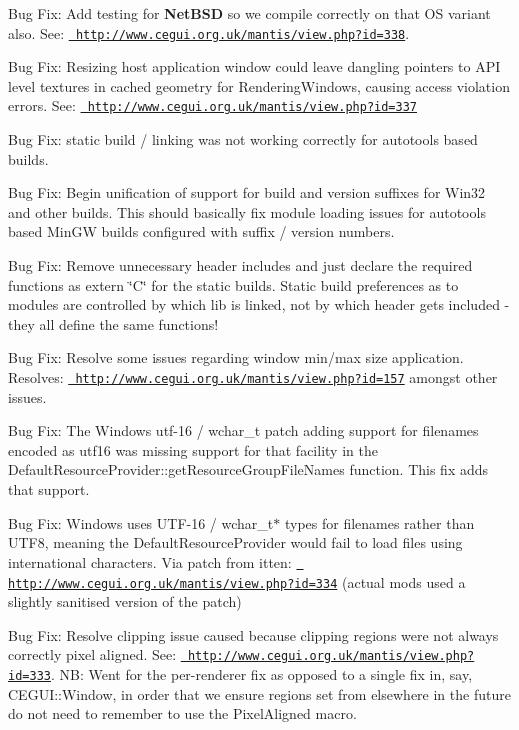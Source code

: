 \begin{DoxyItemize}
\item Bug Fix\+: Add testing for {\bfseries{Net\+B\+SD}} so we compile correctly on that OS variant also. See\+: \href{http://www.cegui.org.uk/mantis/view.php?id=338}{\texttt{ http\+://www.\+cegui.\+org.\+uk/mantis/view.\+php?id=338}}.
\item Bug Fix\+: Resizing host application window could leave dangling pointers to A\+PI level textures in cached geometry for Rendering\+Windows, causing access violation errors. See\+: \href{http://www.cegui.org.uk/mantis/view.php?id=337}{\texttt{ http\+://www.\+cegui.\+org.\+uk/mantis/view.\+php?id=337}}
\item Bug Fix\+: static build / linking was not working correctly for autotools based builds.
\item Bug Fix\+: Begin unification of support for build and version suffixes for Win32 and other builds. This should basically fix module loading issues for autotools based Min\+GW builds configured with suffix / version numbers.
\item Bug Fix\+: Remove unnecessary header includes and just declare the required functions as extern \char`\"{}\+C\char`\"{} for the static builds. Static build preferences as to modules are controlled by which lib is linked, not by which header gets included -\/ they all define the same functions!
\item Bug Fix\+: Resolve some issues regarding window min/max size application. Resolves\+: \href{http://www.cegui.org.uk/mantis/view.php?id=157}{\texttt{ http\+://www.\+cegui.\+org.\+uk/mantis/view.\+php?id=157}} amongst other issues.
\item Bug Fix\+: The Windows utf-\/16 / wchar\+\_\+t patch adding support for filenames encoded as utf16 was missing support for that facility in the Default\+Resource\+Provider\+::get\+Resource\+Group\+File\+Names function. This fix adds that support.
\item Bug Fix\+: Windows uses U\+T\+F-\/16 / wchar\+\_\+t$\ast$ types for filenames rather than U\+T\+F8, meaning the Default\+Resource\+Provider would fail to load files using international characters. Via patch from \textquotesingle{}itten\textquotesingle{}\+: \href{http://www.cegui.org.uk/mantis/view.php?id=334}{\texttt{ http\+://www.\+cegui.\+org.\+uk/mantis/view.\+php?id=334}} (actual mods used a slightly sanitised version of the patch)
\item Bug Fix\+: Resolve clipping issue caused because clipping regions were not always correctly pixel aligned. See\+: \href{http://www.cegui.org.uk/mantis/view.php?id=333}{\texttt{ http\+://www.\+cegui.\+org.\+uk/mantis/view.\+php?id=333}}. NB\+: Went for the per-\/renderer fix as opposed to a single fix in, say, C\+E\+G\+U\+I\+::\+Window, in order that we ensure regions set from elsewhere in the future do not need to remember to use the Pixel\+Aligned macro.

\end{DoxyItemize}
